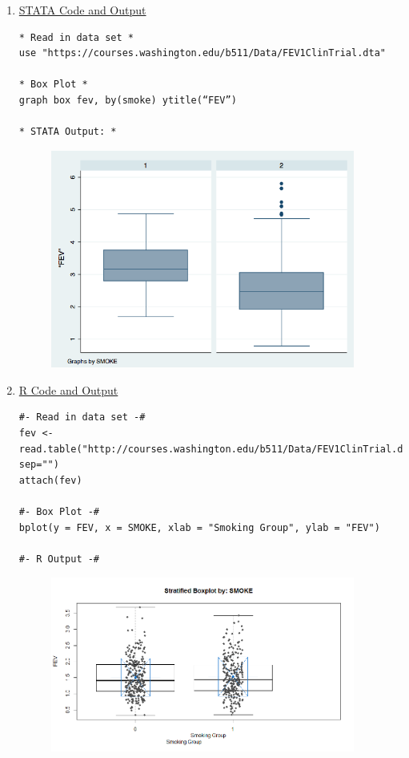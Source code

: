 \documentclass[11pt,letterpaper,fleqn]{report}
\begin{document}
\begin{enumerate}[]
\item \underline{STATA Code and Output}
{\scriptsize
\begin{verbatim}
* Read in data set *
use "https://courses.washington.edu/b511/Data/FEV1ClinTrial.dta"

* Box Plot *
graph box fev, by(smoke) ytitle(“FEV”)

* STATA Output: *
\end{verbatim}}
\begin{figure}[h!]
\centering
\includegraphics[width = 10cm]{FEVbplotSt.png}
\end{figure}
\newpage
\item \underline{R Code and Output}
{\scriptsize
\begin{verbatim}
#- Read in data set -#
fev <- read.table("http://courses.washington.edu/b511/Data/FEV1ClinTrial.dat", sep="")
attach(fev)

#- Box Plot -#
bplot(y = FEV, x = SMOKE, xlab = "Smoking Group", ylab = "FEV")

#- R Output -# 
\end{verbatim}}
\begin{figure}[h!]
\centering
\includegraphics[width = 10cm]{FEVbplotR.png}
\end{figure}
\end{enumerate}
\newpage
\end{document}
